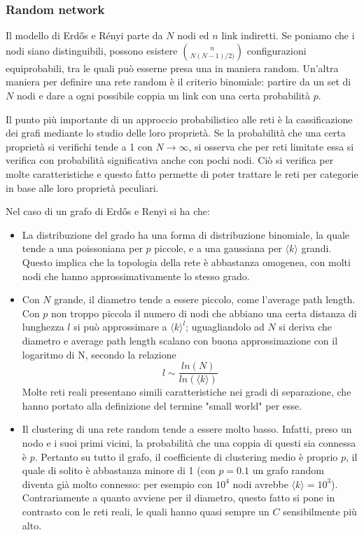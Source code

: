 \subsubsection{Random network}
Il modello di Erdős e Rényi parte da $N$ nodi ed $n$ link indiretti. Se poniamo che i nodi siano distinguibili, possono esistere $\binom{n}{N(N-1)/2)}$ configurazioni equiprobabili, tra le quali può esserne presa una in maniera random. Un'altra maniera per definire una rete random è il criterio binomiale: partire da un set di $N$ nodi e dare a ogni possibile coppia un link con una certa probabilità $p$.

Il punto più importante di un approccio probabilistico alle reti è la cassificazione dei grafi mediante lo studio delle loro proprietà. Se la probabilità che una certa proprietà si verifichi tende a 1 con $N \rightarrow \infty$, si osserva che per reti limitate essa si verifica con probabilità significativa anche con pochi nodi. Ciò si verifica per molte caratteristiche e questo fatto permette di poter trattare le reti per categorie in base alle loro proprietà peculiari.

Nel caso di un grafo di Erdős e Renyi si ha che:
\begin{itemize}
	\item La distribuzione del grado ha una forma di distribuzione binomiale, la quale tende a una poissoniana per $p$ piccole, e a una gaussiana per $\langle k \rangle$ grandi. Questo implica che la topologia della rete è abbastanza omogenea, con molti nodi che hanno approssimativamente lo stesso grado.
	
	\item Con $N$ grande, il diametro tende a essere piccolo, come l'average path length. Con $p$ non troppo piccola il numero di nodi che abbiano una certa distanza di lunghezza $l$ si può approssimare a $\langle k\rangle^l$; uguagliandolo ad $N$ si deriva che diametro e average path length scalano con buona approssimazione con il logaritmo di N, secondo la relazione
	\begin{equation}
	l \sim \frac{ln(N)}{ln(\langle k \rangle)}
	\label{eq:lunghezze}
	\end{equation}
	Molte reti reali presentano simili caratteristiche nei gradi di separazione, che hanno portato alla definizione del termine "small world" per esse.
	
	\item Il clustering di una rete random tende a essere molto basso. Infatti, preso un nodo e i suoi primi vicini, la probabilità che una coppia di questi sia connessa è $p$. Pertanto su tutto il grafo, il coefficiente di clustering medio è proprio $p$, il quale di solito è abbastanza minore di 1 (con $p = 0.1$ un grafo random diventa già molto connesso: per esempio con $10^4$ nodi avrebbe $\langle k\rangle = 10^3$). Contrariamente a quanto avviene per il diametro, questo fatto si pone in contrasto con le reti reali, le quali hanno quasi sempre un $C$ sensibilmente più alto.
\end{itemize}

